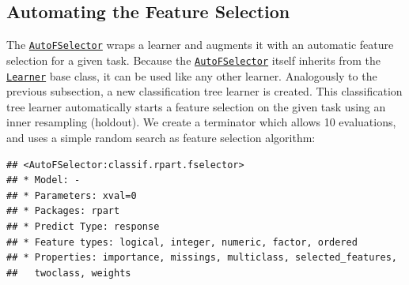 \documentclass[
]{scrbook}
\newenvironment{Shaded}{\begin{snugshade}}{\end{snugshade}}
\newcommand{\AttributeTok}[1]{\textcolor[rgb]{0.77,0.63,0.00}{#1}}
\newcommand{\DecValTok}[1]{\textcolor[rgb]{0.00,0.00,0.81}{#1}}
\newcommand{\FunctionTok}[1]{\textcolor[rgb]{0.00,0.00,0.00}{#1}}
\newcommand{\NormalTok}[1]{#1}
\newcommand{\OtherTok}[1]{\textcolor[rgb]{0.56,0.35,0.01}{#1}}
\newcommand{\SpecialCharTok}[1]{\textcolor[rgb]{0.00,0.00,0.00}{#1}}
\newcommand{\StringTok}[1]{\textcolor[rgb]{0.31,0.60,0.02}{#1}}
\renewenvironment{Shaded} {\begin{snugshade}\small} {\end{snugshade}}
\begin{document}
\hypertarget{autofselect}{%
\subsection{Automating the Feature Selection}\label{autofselect}}

The \href{https://mlr3fselect.mlr-org.com/reference/AutoFSelector.html}{\texttt{AutoFSelector}} wraps a learner and augments it with an automatic feature selection for a given task.
Because the \href{https://mlr3fselect.mlr-org.com/reference/AutoFSelector.html}{\texttt{AutoFSelector}} itself inherits from the \href{https://mlr3.mlr-org.com/reference/Learner.html}{\texttt{Learner}} base class, it can be used like any other learner.
Analogously to the previous subsection, a new classification tree learner is created.
This classification tree learner automatically starts a feature selection on the given task using an inner resampling (holdout).
We create a terminator which allows 10 evaluations, and uses a simple random search as feature selection algorithm:

\begin{Shaded}
\end{Shaded}

\begin{verbatim}
## <AutoFSelector:classif.rpart.fselector>
## * Model: -
## * Parameters: xval=0
## * Packages: rpart
## * Predict Type: response
## * Feature types: logical, integer, numeric, factor, ordered
## * Properties: importance, missings, multiclass, selected_features,
##   twoclass, weights
\end{verbatim}
\end{document}
